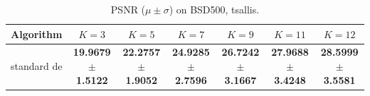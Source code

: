 \begin{table}[htbp]
\centering
\caption{PSNR ($\mu \pm \sigma$) on BSD500, tsallis.}
\label{tab:exp1-tsallis-psnr}
\begin{tabular}{lcccccc}
\toprule
Algorithm & $K=3$ & $K=5$ & $K=7$ & $K=9$ & $K=11$ & $K=12$ \\
\midrule
standard de & \textbf{19.9679 $\pm$ 1.5122} & \textbf{22.2757 $\pm$ 1.9052} & \textbf{24.9285 $\pm$ 2.7596} & \textbf{26.7242 $\pm$ 3.1667} & \textbf{27.9688 $\pm$ 3.4248} & \textbf{28.5999 $\pm$ 3.5581} \\
\bottomrule
\end{tabular}
\end{table}